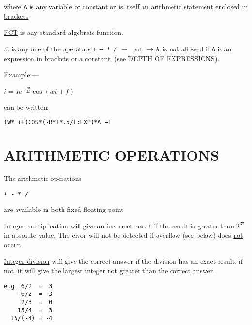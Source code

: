 \documentclass[10pt, a4paper, oneside]{article}
\newcommand{\myuline}[1]{\uline{#1}}
\newcommand{\mytt}[1]{\texttt{\scriptsize #1}}
\newcommand{\mytt}[1]{\texttt{\small #1}}
\begin{document}
\begin{multicols}{2}
where \mytt{A} is any variable or constant or \myuline{is itself an
arithmetic statement enclosed in brackets}

\myuline{FCT} is any standard algebraic function.

£ is any one of the operators \mytt{+ — * /} $\rightarrow$ but
$\rightarrow$A is not allowed if \mytt{A} is an expression in brackets
or a constant.
(see DEPTH OF EXPRESSIONS).

\begin{flushleft}
\myuline{Example}:—
\end{flushleft}

\begin{addmargin}[1cm]{1em}%
\begin{math}
i = ae^{-\frac{Rt}{2L}}\cos(wt+f)
\end{math}
\end{addmargin}
can be written:

\begin{addmargin}[1cm]{1em}%
\begin{lstlisting}
(W*T+F)COS*(-R*T*.5/L:EXP)*A →I
\end{lstlisting}
\end{addmargin}


\section{\myuline{ARITHMETIC OPERATIONS}}

The arithmetic operations

\begin{addmargin}[1cm]{1em}%
\mytt{+ - * /}
\end{addmargin}

\begin{flushleft}
are available in both fixed floating point
\end{flushleft}

\myuline{Integer multiplication} will give an incorrect
result if the result is greater than $2^{37}$ in absolute
value.  The error will not be detected if overflow
(see below) does \myuline{not} occur.

\myuline{Integer division} will give the correct answer if
the division has an exact result, if not, it will give
the largest integer not greater than the correct
answer.

\begin{addmargin}[1cm]{1em}%
\begin{lstlisting}
e.g. 6/2  =  3
    -6/2  = -3
     2/3  =  0
    15/4  =  3
  15/(-4) = -4
\end{lstlisting}
\end{addmargin}


\end{multicols}
\end{document}
